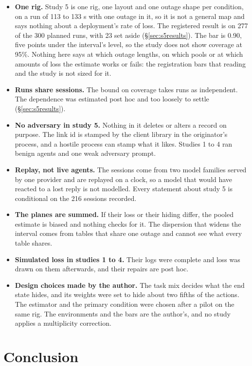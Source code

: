 \documentclass[11pt]{article}
\begin{document}
\begin{itemize}\setlength\itemsep{0pt}\setlength\parskip{0pt}
\item \textbf{One rig.} Study 5 is one rig, one layout and one outage shape per
condition, on a run of 113 to 133 s with one outage in it, so it is not a general map
and says nothing about a deployment's rate of loss. The registered result is on 277 of
the 300 planned runs, with 23 set aside (\S\ref{sec:s5results}). The bar is 0.90, five
points under the interval's level, so the study does not show coverage at 95\%. Nothing
here says at which outage lengths, on which pools or at which amounts of loss the
estimate works or fails: the registration bars that reading and the study is not sized
for it.
\item \textbf{Runs share sessions.} The bound on coverage takes runs as independent.
The dependence was estimated post hoc and too loosely to settle
(\S\ref{sec:s5results}).
\item \textbf{No adversary in study 5.} Nothing in it deletes or alters a record on
purpose. The link id is stamped by the client library in
the originator's process, and a hostile process can stamp what it likes. Studies 1 to 4
ran benign agents and one weak adversary prompt.
\item \textbf{Replay, not live agents.} The sessions come from two model families served
by one provider and are replayed on a clock, so a model that would have reacted to a
lost reply is not modelled. Every statement about study 5 is conditional on the 216
sessions recorded.
\item \textbf{The planes are summed.} If their loss or their hiding differ, the pooled
estimate is biased and nothing checks for it. The dispersion that widens the interval
comes from tables that share one outage and cannot see what every table shares.
\item \textbf{Simulated loss in studies 1 to 4.} Their logs were complete and loss was
drawn on them afterwards, and their repairs are post hoc.
\item \textbf{Design choices made by the author.} The task mix decides what the end
state hides, and its weights were set to hide about two fifths of the actions. The
estimator and the primary condition were chosen after a pilot on the same rig. The
environments and the bars are the author's, and no study applies a multiplicity
correction.
\end{itemize}

\section{Conclusion}
\label{sec:conclusion}
\end{document}
